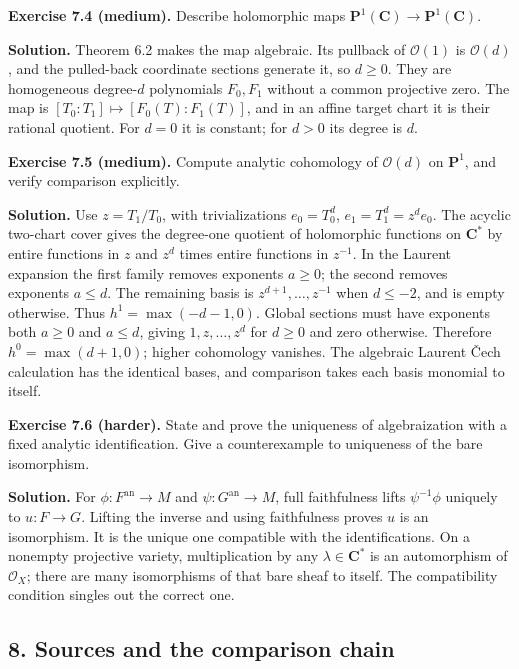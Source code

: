 \documentclass[11pt]{article}
\begin{document}
\textbf{Exercise 7.4 (medium).} Describe holomorphic maps
\(\mathbf P^1(\mathbf C)\to\mathbf P^1(\mathbf C)\).

\textbf{Solution.} Theorem 6.2 makes the map algebraic. Its pullback of
\(\mathcal O(1)\) is \(\mathcal O(d)\), and the pulled-back coordinate
sections generate it, so \(d\geq0\). They are homogeneous degree-\(d\)
polynomials \(F_0,F_1\) without a common projective zero. The map is
\([T_0:T_1]\mapsto[F_0(T):F_1(T)]\), and in an affine target chart it is
their rational quotient. For \(d=0\) it is constant; for \(d>0\) its
degree is \(d\).

\textbf{Exercise 7.5 (medium).} Compute analytic cohomology of
\(\mathcal O(d)\) on \(\mathbf P^1\), and verify comparison explicitly.

\textbf{Solution.} Use \(z=T_1/T_0\), with trivializations
\(e_0=T_0^d\), \(e_1=T_1^d=z^de_0\). The acyclic two-chart cover gives
the degree-one quotient of holomorphic functions on \(\mathbf C^*\) by
entire functions in \(z\) and \(z^d\) times entire functions in
\(z^{-1}\). In the Laurent expansion the first family removes exponents
\(a\geq0\); the second removes exponents \(a\leq d\). The remaining
basis is \(z^{d+1},\ldots,z^{-1}\) when \(d\leq-2\), and is empty
otherwise. Thus \(h^1=\max(-d-1,0)\). Global sections must have
exponents both \(a\geq0\) and \(a\leq d\), giving \(1,z,\ldots,z^d\) for
\(d\geq0\) and zero otherwise. Therefore \(h^0=\max(d+1,0)\); higher
cohomology vanishes. The algebraic Laurent Čech calculation has the
identical bases, and comparison takes each basis monomial to itself.

\textbf{Exercise 7.6 (harder).} State and prove the uniqueness of
algebraization with a fixed analytic identification. Give a
counterexample to uniqueness of the bare isomorphism.

\textbf{Solution.} For \(\phi:F^{\mathrm{an}}\to M\) and
\(\psi:G^{\mathrm{an}}\to M\), full faithfulness lifts \(\psi^{-1}\phi\)
uniquely to \(u:F\to G\). Lifting the inverse and using faithfulness
proves \(u\) is an isomorphism. It is the unique one compatible with the
identifications. On a nonempty projective variety, multiplication by any
\(\lambda\in\mathbf C^*\) is an automorphism of \(\mathcal O_X\); there
are many isomorphisms of that bare sheaf to itself. The compatibility
condition singles out the correct one.

\subsection{8. Sources and the comparison
chain}\label{sources-and-the-comparison-chain}
\end{document}

